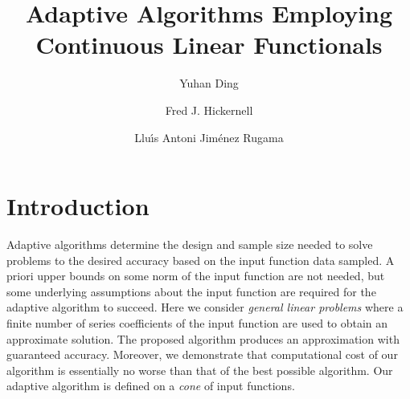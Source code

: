 \documentclass[graybox,footinfo]{svmult}
\begin{document}
\title*{Adaptive Algorithms Employing Continuous Linear Functionals}
\author{Yuhan Ding \and Fred J. Hickernell \and Llu\'{\i}s Antoni Jim\'{e}nez Rugama}

\maketitle

\abstract{}



\section{Introduction}
Adaptive algorithms determine the design and sample size needed to solve problems to the desired accuracy based on the input function data sampled.  A priori upper bounds on some norm of the input function are not needed, but some underlying assumptions about the input function are required for the adaptive algorithm to succeed.  Here we consider \emph{general linear problems} where a finite number of series coefficients of the input function are used to obtain an approximate solution.  The proposed algorithm produces an approximation with guaranteed accuracy.  Moreover, we demonstrate that  computational cost of our algorithm is essentially no worse than that of the best possible algorithm.  Our adaptive algorithm is defined on a \emph{cone} of input functions.
\end{document}
